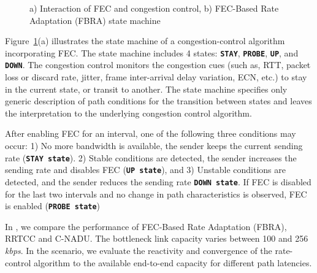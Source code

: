 
\begin{figure}
  \centerline{
}
\caption{a) Interaction of FEC and congestion control, b) FEC-Based Rate
Adaptation (FBRA) state machine }
\label{fig:fecrc-intro}
\end{figure}

Figure~\ref{fig:fecrc-intro}(a) illustrates the state machine of a
congestion-control algorithm incorporating FEC. The state machine includes 4
states: \texttt{\textbf{STAY}}, \texttt{\textbf{PROBE}}, \texttt{\textbf{UP}},
and \texttt{\textbf{DOWN}}. The congestion control monitors the congestion
cues (such as, RTT, packet loss or discard rate, jitter, frame inter-arrival
delay variation, ECN, etc.) to stay in the current state, or transit to
another. The state machine specifies only generic description of path
conditions for the transition between states and leaves the interpretation to
the underlying congestion control algorithm.

After enabling FEC for an interval, one of the following three conditions may
occur: 1) No more bandwidth is available, the sender keeps the current sending
rate (\texttt{\textbf{STAY state}}). 2) Stable conditions are detected, the
sender increases the sending rate and disables FEC (\texttt{\textbf{UP
state}}), and 3) Unstable conditions are detected, and the sender reduces the
sending rate \texttt{\textbf{DOWN state}}. If FEC is disabled for the last two
intervals and no change in path characteristics is observed, FEC is enabled
(\texttt{\textbf{PROBE state}})

In , we compare the performance of FEC-Based Rate Adaptation
(FBRA), RRTCC and C-NADU. The bottleneck link capacity varies between 100 and
256 \emph{kbps}. In the scenario, we evaluate the reactivity and convergence
of the rate-control algorithm to the available end-to-end capacity for
different path latencies.

